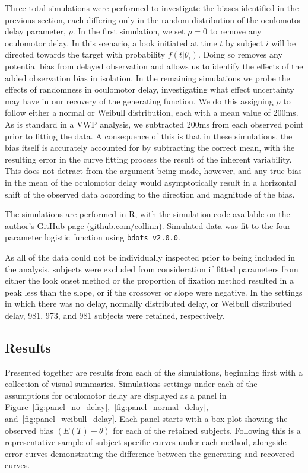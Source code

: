 \documentclass{article}
\newcommand{\xt}{\texttt}
\begin{document}
Three total simulations were performed to investigate the biases identified in the previous section, each differing only in the random distribution of the oculomotor delay parameter, $\rho$. In the first simulation, we set $\rho = 0$ to remove any oculomotor delay. In this scenario, a look initiated at time $t$ by subject $i$ will be directed towards the target with probability $f(t|\theta_i)$. Doing so removes any potential bias from delayed observation and allows us to identify the effects of the added observation bias in isolation. In the remaining simulations we probe the effects of randomness in oculomotor delay, investigating what effect uncertainty may have in our recovery of the generating function. We do this assigning $\rho$ to follow either a normal or Weibull distribution, each with a mean value of 200ms. As is standard in a VWP analysis, we subtracted 200ms from each observed point prior to fitting the data. A consequence of this is that in these simulations, the bias itself is accurately accounted for by subtracting the correct mean, with the resulting error in the curve fitting process the result of the inherent variability. This does not detract from the argument being made, however, and any true bias in the mean of the oculomotor delay would asymptotically result in a horizontal shift of the observed data according to the direction and magnitude of the bias.

The simulations are performed in R, with the simulation code available on the author's GitHub page (github.com/collinn). Simulated data was fit to the four parameter logistic function using \xt{bdots v2.0.0}.

As all of the data could not be individually inspected prior to being included in the analysis, subjects were excluded from consideration if fitted parameters from either the look onset method or the proportion of fixation method resulted in a peak less than the slope, or if the crossover or slope were negative. In the settings in which there was no delay, normally distributed delay, or Weibull distributed delay, 981, 973, and 981 subjects were retained, respectively.


\subsection{Results}

Presented together are results from each of the simulations, beginning first with a collection of visual summaries. Simulations settings under each of the assumptions for oculomotor delay are displayed as a panel in Figure~\ref{fig:panel_no_delay},~\ref{fig:panel_normal_delay}, and~\ref{fig:panel_weibull_delay}. Each panel starts with a box plot showing the observed bias $(E(T) - \theta)$ for each of the retained subjects. Following this is a representative sample of subject-specific curves under each method, alongside error curves demonstrating the difference between the generating and recovered curves. 
\end{document}
